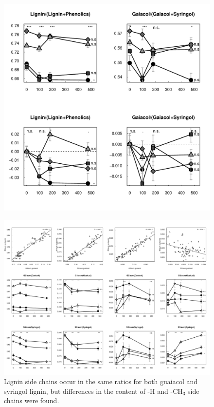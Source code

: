 \documentclass[preprint,review,12pt]{elsarticle}
\begin{document}
\newpage
\begin{figure}[h!]
\begin{center}
\includegraphics{aap-g2syTS}
\end{center}
\caption{}
\label{fig:gsyph}
\end{figure}

\begin{figure}
\centering
{}
\includegraphics{aap-sidechainratios}
\caption{Lignin side chains occur in the same ratios for both guaiacol and syringol lignin, but differences in the content of -H and -CH$_3$ side chains were found.}
\label{fig:sidechainratios}
\end{figure}
\end{document}
